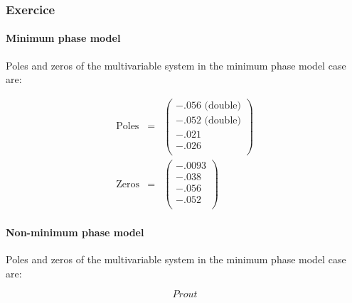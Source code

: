 \subsubsection{Exercice}

\paragraph{Minimum phase model}

Poles and zeros of the multivariable system in the minimum phase model case are:

$$\begin{array}{rcl}
    \text{Poles} & = & 
    \left(\begin{array}{c}  
            -.056 \text{ (double)} \\
            -.052 \text{ (double)} \\
    -.021 \\
    -.026 \\
    \end{array}\right) \\ 
    \text{Zeros} & = & 
    \left(\begin{array}{c}
              -.0093 \\
                 -.038 \\
                    -.056 \\
                       -.052 \\
    \end{array}\right)
\end{array}
    $$

\paragraph{Non-minimum phase model}

Poles and zeros of the multivariable system in the minimum phase model case are:

$$
Prout
$$

